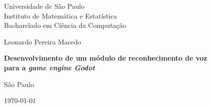 \thispagestyle{empty}
\begin{center}
    \vspace*{2.3cm}
    Universidade de São Paulo \\
    Instituto de Matemática e Estatística \\
    Bacharelado em Ciência da Computação


    \vspace*{3cm}
    \large{Leonardo Pereira Macedo}


    \vspace{3cm}
    \textbf{\large{Desenvolvimento de um módulo de reconhecimento de voz \\
    para a \textit{game engine} \textit{Godot}}}


    \vskip 5cm
    \normalsize{São Paulo}

    \today
\end{center}

